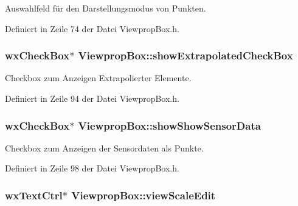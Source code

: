 Auswahlfeld für den Darstellungsmodus von Punkten. 



Definiert in Zeile 74 der Datei Viewprop\-Box.\-h.

\hypertarget{classViewpropBox_a26459f6ab8498b578ecf30dcb4fd582e}{
\subsubsection[{show\-Extrapolated\-Check\-Box}]{\setlength{\rightskip}{0pt plus 5cm}wx\-Check\-Box$\ast$ Viewprop\-Box\-::show\-Extrapolated\-Check\-Box\hspace{0.3cm}{\ttfamily [private]}}}\label{classViewpropBox_a26459f6ab8498b578ecf30dcb4fd582e}


Checkbox zum Anzeigen Extrapolierter Elemente. 



Definiert in Zeile 94 der Datei Viewprop\-Box.\-h.

\hypertarget{classViewpropBox_a731fabc531998315b0850a3b60eb3c51}{
\subsubsection[{show\-Show\-Sensor\-Data}]{\setlength{\rightskip}{0pt plus 5cm}wx\-Check\-Box$\ast$ Viewprop\-Box\-::show\-Show\-Sensor\-Data\hspace{0.3cm}{\ttfamily [private]}}}\label{classViewpropBox_a731fabc531998315b0850a3b60eb3c51}


Checkbox zum Anzeigen der Sensordaten als Punkte. 



Definiert in Zeile 98 der Datei Viewprop\-Box.\-h.

\hypertarget{classViewpropBox_ae275307ddd3a84c91298e78b826f1ae1}{
\subsubsection[{view\-Scale\-Edit}]{\setlength{\rightskip}{0pt plus 5cm}wx\-Text\-Ctrl$\ast$ Viewprop\-Box\-::view\-Scale\-Edit\hspace{0.3cm}{\ttfamily [private]}}}\label{classViewpropBox_ae275307ddd3a84c91298e78b826f1ae1}


